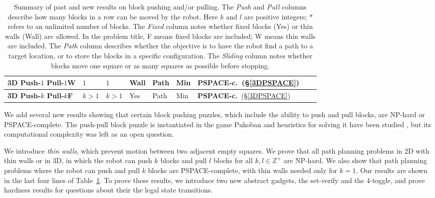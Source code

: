 \begin{table}
{\begin{tabular}{|l|l|l|l|l|l|l|l|l|}
\textbf{3D Push-$1$ Pull-$1$W} & $1$ & $1$ & Wall & Path & Min &  \textbf{PSPACE-c.}\ (\S  \ref{3DPSPACE}) \\ \hline
\textbf{3D Push-$k$ Pull-$k$F} & $k > 1$ & $k >1$ & Yes & Path & Min &  \textbf{PSPACE-c.}\ (\S  \ref{3DPSPACE}) \\ \hline
\end{tabular}
}
\caption{Summary of past and new results on block pushing and/or pulling. The \emph{Push} and \emph{Pull} columns describe how many blocks in a row can be moved by the robot. Here $k$ and $l$ are positive integers; $*$ refers to an unlimited number of blocks. The \emph{Fixed} column notes whether fixed blocks (Yes) or thin walls (Wall) are allowed. In the problem title, F means fixed blocks are included; W means thin walls are included. The \emph{Path} column describes whether the objective is to have the robot find a path to a target location, or to store the blocks in a specific configuration. The \emph{Sliding} column notes whether blocks move one square or as many squares as possible before stopping.}
\label{BlocksTable}
\end{table}

We add several new results showing that certain block pushing puzzles, which include the ability to push and pull blocks, are NP-hard or PSPACE-complete. The push-pull block puzzle is instantiated in the game Pukoban and heuristics for solving it have been studied \cite{zubaranagent}, but its computational complexity was left as an open question.

We introduce \emph{thin walls}, which prevent motion between two adjacent empty squares. We prove that all path planning problems in 2D with thin walls or in 3D, in which the robot can push $k$ blocks and pull $l$ blocks for all $k,l \in \mathbb{Z}^+$ are NP-hard. We also show that path planning problems where the robot can push and pull $k$ blocks are PSPACE-complete, with thin walls needed only for $k=1$. Our results are shown in the last four lines of Table~\ref{BlocksTable}. To prove these results, we introduce two new abstract gadgets, the set-verify and the 4-toggle, and prove hardness results for questions about their the legal state transitions. 


